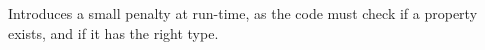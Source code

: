 \documentclass[thesis]{subfiles}
\begin{document}
\TODO Introduces a small penalty at run-time, as the code must check if a
property exists, and if it has the right type.


%
%
%
%
%
%
%
%
%

\OnlyInSubfile{\printglobalbibliography}
\end{document}
